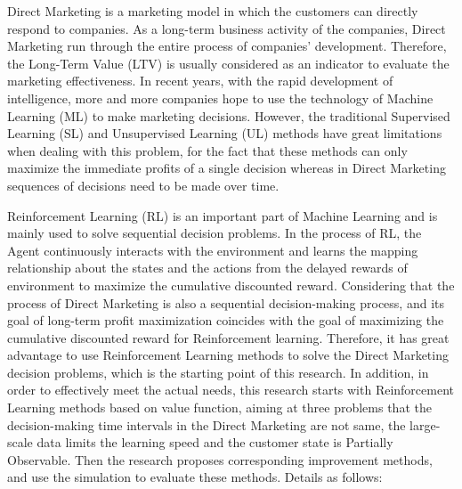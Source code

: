 \begin{enabstract}

Direct Marketing is a marketing model in which the customers can directly respond to companies. As a long-term business activity of the companies, Direct Marketing run through the entire process of companies' development. Therefore, the Long-Term Value (LTV) is usually considered as an indicator to evaluate the marketing effectiveness. In recent years, with the rapid development of intelligence, more and more companies hope to use the technology of Machine Learning (ML) to make marketing decisions. However, the traditional Supervised Learning (SL) and Unsupervised Learning (UL) methods have great limitations when dealing with this problem, for the fact that these methods can only maximize the immediate profits of a single decision whereas in Direct Marketing sequences of decisions need to be made over time.

Reinforcement Learning (RL) is an important part of Machine Learning and is mainly used to solve sequential decision problems. In the process of RL, the Agent continuously interacts with the environment and learns the mapping relationship about the states and the actions from the delayed rewards of environment to maximize the cumulative discounted reward. Considering that the process of Direct Marketing is also a sequential decision-making process, and its goal of long-term profit maximization coincides with the goal of maximizing the cumulative discounted reward for Reinforcement learning. Therefore, it has great advantage to use Reinforcement Learning methods to solve the Direct Marketing decision problems, which is the starting point of this research. In addition, in order to effectively meet the actual needs, this research starts with Reinforcement Learning methods based on value function, aiming at three problems that the decision-making time intervals in the Direct Marketing are not same, the large-scale data limits the learning speed and the customer state is Partially Observable. Then the research proposes corresponding improvement methods, and use the simulation to evaluate these methods. Details as follows:


\end{enabstract}

